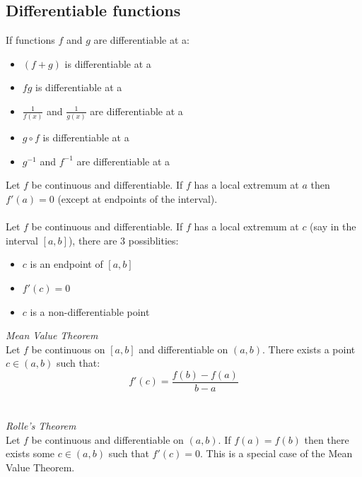 \documentclass{scrartcl}
\begin{document}
\subsection{Differentiable functions}
If functions $ f $ and $ g $ are differentiable at a:
\begin{itemize}
\item $ (f + g) $ is differentiable at a
\item $ fg $ is differentiable at a
\item $ \frac{1}{f(x)} $ and $ \frac{1}{g(x)} $ are differentiable at a
\item $ g \circ f $ is differentiable at a
\item $ g^{-1} $ and $ f^{-1} $ are differentiable at a
\end{itemize}
Let $ f $ be continuous and differentiable. If $ f $ has a local extremum at $ a $ then $ f'(a) = 0 $ (except at endpoints of the interval).
\\\\
Let $ f $ be continuous and differentiable. If $ f $ has a local extremum at $ c $ (say in the interval $ [a, b] $), there are 3 possiblities:
\begin{itemize}
\item $ c $ is an endpoint of $ [a, b] $
\item $ f'(c) = 0 $
\item $ c $ is a non-differentiable point
\end{itemize}
\textit{Mean Value Theorem}
\\
Let $ f $ be continuous on $ [a, b] $ and differentiable on $ (a, b) $. There exists a point $ c \in (a, b) $ such that:
\begin{equation}
f'(c) = \frac{f(b) - f(a)}{b - a}
\end{equation}
\\\\
\textit{Rolle's Theorem}
\\
Let $ f $ be continuous and differentiable on $ (a, b) $. If $ f(a) = f(b) $ then there exists some $ c \in (a, b) $ such that $ f'(c) = 0 $. This is a special case of the Mean Value Theorem.
\end{document}
